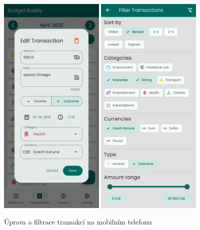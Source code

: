 \documentclass[
  biblatex,
  figures=true,
  tables=false,
  glossaries,
  index
]{kidiplom}
\begin{document}
\begin{figure}
  \centering
  \includegraphics[width=0.45\textwidth]{images/edit-transaction-mobile.png}
  \hspace{0.5em}
  \includegraphics[width=0.45\textwidth]{images/filters-mobile.png}
  \caption{Úprava a filtrace transakcí na mobilním telefonu}
  \label{fig:transactions-edit}
\end{figure}
\end{document}

